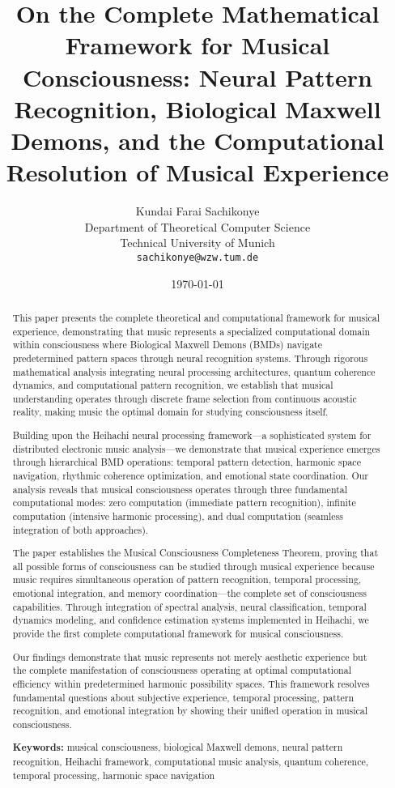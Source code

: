 \documentclass[12pt,a4paper]{article}
\title{On the Complete Mathematical Framework for Musical Consciousness: Neural Pattern Recognition, Biological Maxwell Demons, and the Computational Resolution of Musical Experience}
\author{Kundai Farai Sachikonye\\
Department of Theoretical Computer Science\\
Technical University of Munich\\
\texttt{sachikonye@wzw.tum.de}}
\date{\today}
\begin{document}
\maketitle

\begin{abstract}
This paper presents the complete theoretical and computational framework for musical experience, demonstrating that music represents a specialized computational domain within consciousness where Biological Maxwell Demons (BMDs) navigate predetermined pattern spaces through neural recognition systems. Through rigorous mathematical analysis integrating neural processing architectures, quantum coherence dynamics, and computational pattern recognition, we establish that musical understanding operates through discrete frame selection from continuous acoustic reality, making music the optimal domain for studying consciousness itself.

Building upon the Heihachi neural processing framework—a sophisticated system for distributed electronic music analysis—we demonstrate that musical experience emerges through hierarchical BMD operations: temporal pattern detection, harmonic space navigation, rhythmic coherence optimization, and emotional state coordination. Our analysis reveals that musical consciousness operates through three fundamental computational modes: zero computation (immediate pattern recognition), infinite computation (intensive harmonic processing), and dual computation (seamless integration of both approaches).

The paper establishes the Musical Consciousness Completeness Theorem, proving that all possible forms of consciousness can be studied through musical experience because music requires simultaneous operation of pattern recognition, temporal processing, emotional integration, and memory coordination—the complete set of consciousness capabilities. Through integration of spectral analysis, neural classification, temporal dynamics modeling, and confidence estimation systems implemented in Heihachi, we provide the first complete computational framework for musical consciousness.

Our findings demonstrate that music represents not merely aesthetic experience but the complete manifestation of consciousness operating at optimal computational efficiency within predetermined harmonic possibility spaces. This framework resolves fundamental questions about subjective experience, temporal processing, pattern recognition, and emotional integration by showing their unified operation in musical consciousness.

\textbf{Keywords:} musical consciousness, biological Maxwell demons, neural pattern recognition, Heihachi framework, computational music analysis, quantum coherence, temporal processing, harmonic space navigation
\end{abstract}
\end{document}
